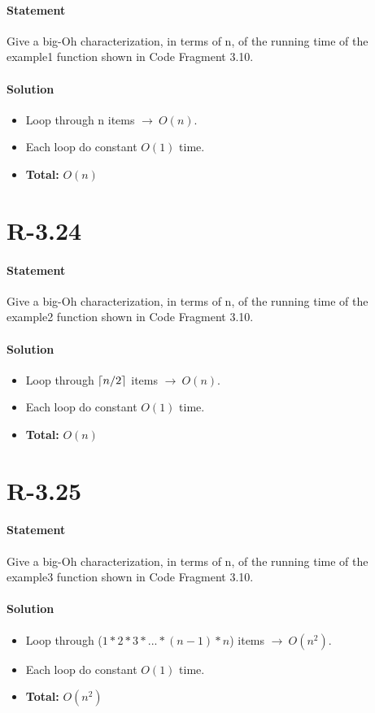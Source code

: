\documentclass{article}
\DeclarePairedDelimiter{\ceil}{\lceil}{\rceil}
\begin{document}
\paragraph{Statement}
Give a big-Oh characterization, in terms of n, of the running time of the example1 function shown in Code Fragment 3.10.
\paragraph{Solution}
  \begin{itemize}
    \item Loop through n items $\rightarrow \ O(n)$.
    \item Each loop do constant $O(1)$ time.
    \item \textbf{Total:} $O(n)$
  \end{itemize}
\section{R-3.24}
\paragraph{Statement}
Give a big-Oh characterization, in terms of n, of the running time of the example2 function shown in Code Fragment 3.10.
\paragraph{Solution}
  \begin{itemize}
    \item Loop through $\ceil{n/2}$ items $\rightarrow \ O(n)$.
    \item Each loop do constant $O(1)$ time.
    \item \textbf{Total:} $O(n)$
  \end{itemize}
\section{R-3.25}
\paragraph{Statement}
Give a big-Oh characterization, in terms of n, of the running time of the example3 function shown in Code Fragment 3.10.
\paragraph{Solution}
  \begin{itemize}
    \item Loop through ($1*2*3*...*(n-1)*n$) items $\rightarrow \ O(n^2)$.
    \item Each loop do constant $O(1)$ time.
    \item \textbf{Total:} $O(n^2)$
  \end{itemize}
\end{document}
